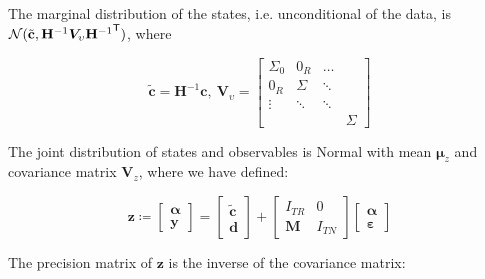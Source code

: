 \documentclass[notitlepage,a4paper,12pt]{article}
\newcommand{\transpose}[1]{{#1}^{\sf{T}}}
\begin{document}
The marginal distribution of the states, i.e. unconditional of the data, is $\mathcal{N}(\tilde{\mathbf{c}},\mathbf{H}^{-1} \bm{V}_{\upsilon} \transpose{\mathbf{H}^{-1}})$, where 

$$
\tilde{\mathbf{c}}
=
\mathbf{H}^{-1} \mathbf{c}
, \:
\mathbf{V}_{\upsilon} = 
\begin{bmatrix}
    \Sigma_{0} & 0_R & \dots \\
    0_R & \Sigma & \ddots \\
    \vdots & \ddots & \ddots \\
    & & & \Sigma 
\end{bmatrix}
$$

The joint distribution of states and observables is Normal with mean $\boldsymbol{\mu}_z$ and covariance matrix $\bm{V}_z$, where we have defined: 


\begin{equation}
    \mathbf{z} 
    \coloneqq 
    \begin{bmatrix}
        \boldsymbol{\alpha} \\
        \mathbf{y}
    \end{bmatrix} 
    = 
    \begin{bmatrix}
        \tilde{\mathbf{c}} \\
        \mathbf{d} 
    \end{bmatrix}
    +
    \begin{bmatrix}
        I_{TR} & 0 \\
        \mathbf{M} & I_{TN} 
    \end{bmatrix}
    \begin{bmatrix}
        \boldsymbol{\alpha}\\
        \boldsymbol{\varepsilon}
    \end{bmatrix} 
\end{equation}

 The precision matrix of $\mathbf{z}$ is the inverse of the covariance matrix: 
\end{document}
